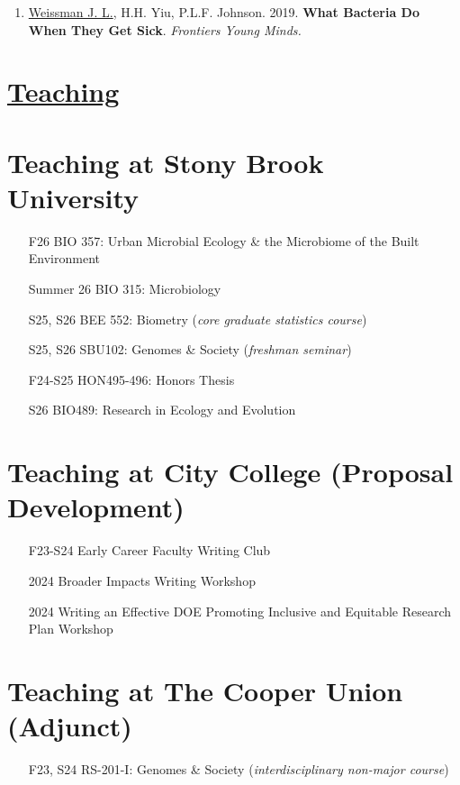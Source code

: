 \documentclass[]{res}
\begin{document}
\begin{resume}
\begin{enumerate}
\item \underline{Weissman J. L.}, H.H. Yiu, P.L.F. Johnson. 2019. {\bf What Bacteria Do When They Get Sick}. \emph{Frontiers Young Minds.}

\end{enumerate}


\section{\underline{Teaching}} 

\section{Teaching at Stony Brook University} 
\begin{itemize} \itemsep -2pt
\item[F26] BIO 357: Urban Microbial Ecology \& the Microbiome of the Built Environment
\item[Summer 26] BIO 315: Microbiology 
\item[S25, S26] BEE 552: Biometry (\emph{core graduate statistics course})
\item[S25, S26] SBU102: Genomes \& Society (\emph{freshman seminar})
\item[F24-S25] HON495-496: Honors Thesis 
\item[S26] BIO489: Research in Ecology and Evolution 
\end{itemize}

\section{ Teaching at City College (Proposal Development)} 
\begin{itemize} \itemsep -2pt
\item[F23-S24] Early Career Faculty Writing Club 
\item[2024] Broader Impacts Writing Workshop 
\item[2024] Writing an Effective DOE Promoting Inclusive and Equitable Research Plan Workshop 
\end{itemize}


\section{Teaching at The Cooper Union (Adjunct)} 
\begin{itemize} \itemsep -2pt
\item[F23, S24] RS-201-I: Genomes \& Society (\emph{interdisciplinary non-major course})
\end{itemize}


\end{resume}
\end{document}
